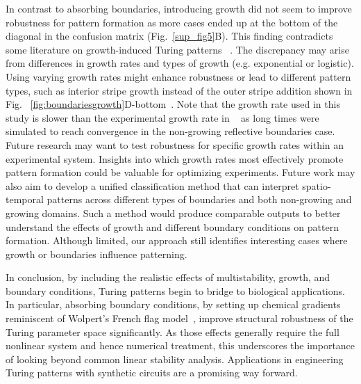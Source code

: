 In contrast to absorbing boundaries, introducing growth did not seem to improve robustness for pattern formation as more cases ended up at the bottom of the diagonal in the confusion matrix (Fig.~\ref{sup_fig5}B).
This finding contradicts some literature on growth-induced Turing patterns ~\parencite{gaffney2010}.
The discrepancy may arise from differences in growth rates and types of growth (e.g. exponential or logistic).
Using varying growth rates might enhance robustness or lead to different pattern types, such as interior stripe growth instead of the outer stripe addition shown in Fig. ~\ref{fig:boundariesgrowth}D-bottom~\parencite{konow2019turing}. Note that the growth rate used in this study is slower than the experimental growth rate in ~\parencite{Oliver2023} as long times were simulated to reach convergence in the non-growing reflective boundaries case. Future research may want to test robustness for specific growth rates within an experimental system. Insights into which growth rates most effectively promote pattern formation could be valuable for optimizing experiments.
Future work may also aim to develop a unified classification method that can interpret spatio-temporal patterns across different types of boundaries and both non-growing and growing domains. Such a method would produce comparable outputs to better understand the effects of growth and different boundary conditions on pattern formation.
Although limited, our approach still identifies interesting cases where growth or boundaries influence patterning.


In conclusion, by including the realistic effects of multistability, growth, and boundary conditions, Turing patterns begin to bridge to biological applications. In particular, absorbing boundary conditions, by setting up chemical gradients reminiscent of Wolpert's French flag model~\parencite{wolpert1969positional}, improve structural robustness of the Turing parameter space significantly. As those effects generally require the full nonlinear system and hence numerical treatment, this underscores the importance of looking beyond common linear stability analysis. Applications in engineering Turing patterns with synthetic circuits are a promising way forward.
